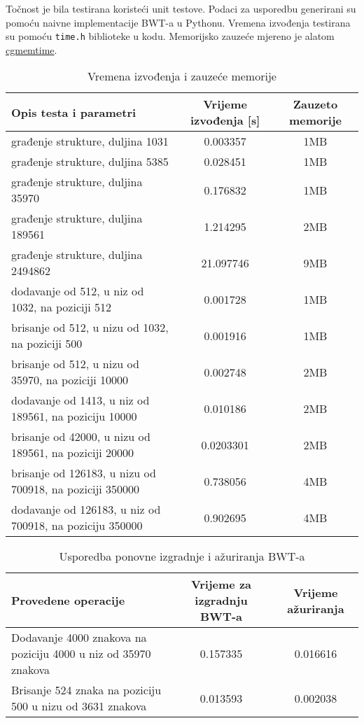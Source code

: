 \documentclass{ferseminar}
\begin{document}
Točnost je bila testirana koristeći unit testove. Podaci za usporedbu generirani su pomoću naivne implementacije BWT-a u Pythonu. Vremena izvođenja testirana su pomoću \texttt{time.h} biblioteke u kodu. Memorijsko zauzeće mjereno je alatom \href{https://github.com/isovic/cgmemtime}{cgmemtime}.
\begin{table}[h]


\begin{tabular}{|m{7cm}|c|c| }
	\hline
	Opis testa i parametri & Vrijeme izvođenja [s] & Zauzeto memorije \\
	\hline
	građenje strukture, duljina 1031 & 0.003357 & 1MB \\
	\hline
	građenje strukture, duljina 5385 & 0.028451 & 1MB \\
	\hline
	građenje strukture, duljina 35970 & 0.176832 & 1MB \\
	\hline
	građenje strukture,  duljina 189561 & 1.214295 & 2MB \\
	\hline
	građenje strukture, duljina 2494862 & 21.097746 & 9MB \\
	\hline
	dodavanje od 512, u niz od 1032, na poziciji 512   & 0.001728 & 1MB \\
	\hline
	brisanje od 512, u nizu od 1032, na poziciji 500   & 0.001916 & 1MB \\
	\hline
	brisanje od 512, u nizu od 35970, na poziciji 10000   & 0.002748 & 2MB \\
	\hline
	dodavanje od 1413, u niz od 189561, na poziciju 10000   & 0.010186 & 2MB \\
	\hline
	brisanje od 42000, u nizu od 189561, na poziciji 20000   & 0.0203301 & 2MB \\
	\hline
	brisanje od 126183, u nizu od 700918, na poziciji 350000   & 0.738056 & 4MB \\
	\hline
	dodavanje od 126183, u niz od 700918, na poziciju 350000   & 0.902695 & 4MB \\
	\hline	
\end{tabular}
\caption{Vremena izvođenja i zauzeće memorije}
\label{tablica:vremena}
\end{table}
\begin{table}[h]
\begin{tabular}{|m{5cm}|c|c|}
	\hline
	Provedene operacije & Vrijeme za izgradnju BWT-a & Vrijeme ažuriranja \\
	\hline
	Dodavanje 4000 znakova na poziciju 4000 u niz od 35970 znakova & 0.157335 & 0.016616 \\
	\hline
	Brisanje 524 znaka na poziciju 500 u nizu od 3631 znakova & 0.013593 & 0.002038 \\
	\hline
\end{tabular}
\caption{Usporedba ponovne izgradnje i ažuriranja BWT-a}
\label{tablica:usporedba}
\end{table}
\end{document}
